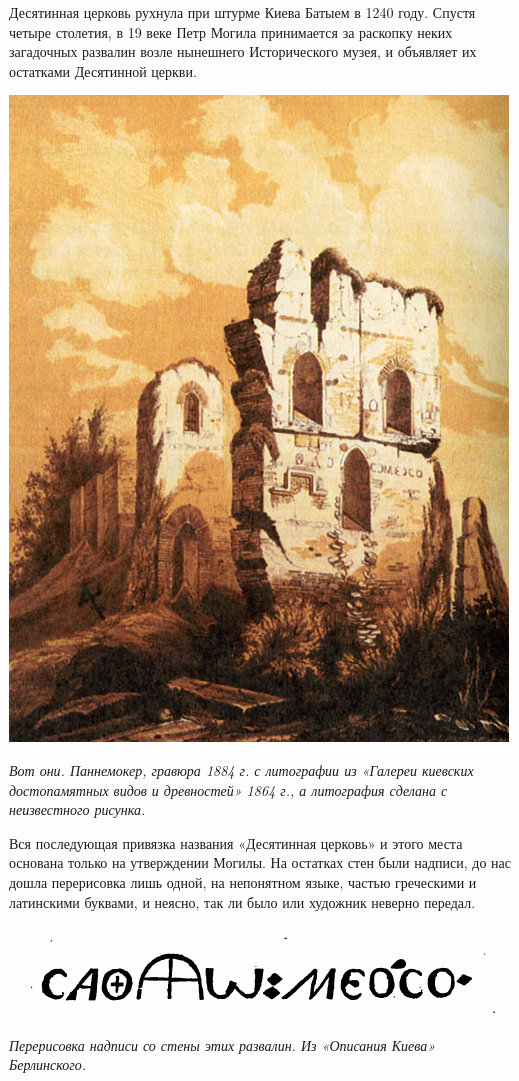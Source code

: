 Десятинная церковь рухнула при штурме Киева Батыем в 1240 году. Спустя четыре столетия, в 19 веке Петр Могила принимается за раскопку неких загадочных развалин возле нынешнего Исторического музея, и объявляет их остатками Десятинной церкви.

\begin{center}
\includegraphics[width=0.82\linewidth]{chast-volga/olga/pannemoker-1826.jpg}

\textit{Вот они. Паннемокер, гравюра 1884 г. с литографии из «Галереи киевских достопамятных видов и древностей» 1864 г., а литография сделана с неизвестного рисунка.}
\end{center}

Вся последующая привязка названия «Десятинная церковь» и этого места основана только на утверждении Могилы. На остатках стен были надписи, до нас дошла перерисовка лишь одной, на непонятном языке, частью греческими и латинскими буквами, и неясно, так ли было или художник неверно передал.

\begin{center}
\includegraphics[width=\linewidth]{chast-volga/olga/caption.png}

\textit{Перерисовка надписи со стены этих развалин. Из «Описания Киева» Берлинского.}
\end{center}

